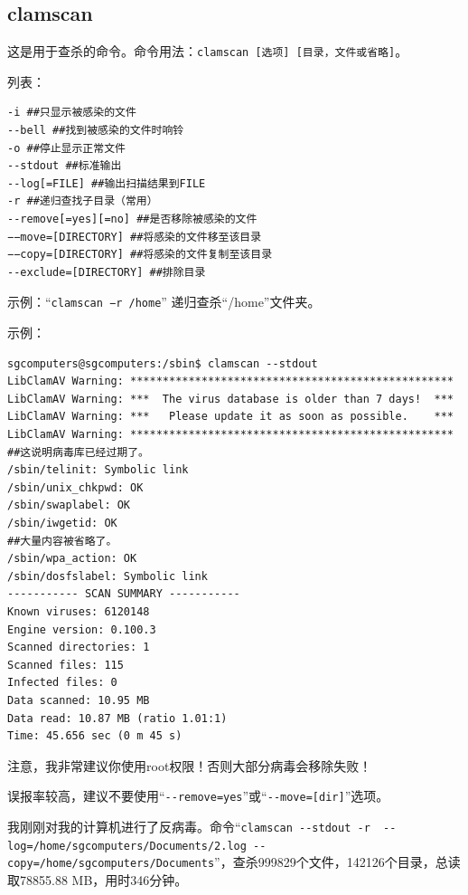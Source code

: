 \subsection{clamscan}
\cite{mancs}\par
这是用于查杀的命令。命令用法：\verb|clamscan [选项] [目录，文件或省略]|。\par
[选项]列表：\par
\begin{verbatim}
-i ##只显示被感染的文件
--bell ##找到被感染的文件时响铃
-o ##停止显示正常文件
--stdout ##标准输出
--log[=FILE] ##输出扫描结果到FILE
-r ##递归查找子目录（常用）
--remove[=yes][=no] ##是否移除被感染的文件
−−move=[DIRECTORY] ##将感染的文件移至该目录
−−copy=[DIRECTORY] ##将感染的文件复制至该目录
--exclude=[DIRECTORY] ##排除目录
\end{verbatim} \par
示例：“\verb|clamscan −r /home|”  递归查杀“/home”文件夹。\par
示例：
\begin{verbatim}
sgcomputers@sgcomputers:/sbin$ clamscan --stdout
LibClamAV Warning: **************************************************
LibClamAV Warning: ***  The virus database is older than 7 days!  ***
LibClamAV Warning: ***   Please update it as soon as possible.    ***
LibClamAV Warning: **************************************************
##这说明病毒库已经过期了。
/sbin/telinit: Symbolic link
/sbin/unix_chkpwd: OK
/sbin/swaplabel: OK
/sbin/iwgetid: OK
##大量内容被省略了。
/sbin/wpa_action: OK
/sbin/dosfslabel: Symbolic link
----------- SCAN SUMMARY -----------
Known viruses: 6120148
Engine version: 0.100.3
Scanned directories: 1
Scanned files: 115
Infected files: 0
Data scanned: 10.95 MB
Data read: 10.87 MB (ratio 1.01:1)
Time: 45.656 sec (0 m 45 s)
\end{verbatim} \par
{\color{red}注意，我非常建议你使用root权限！否则大部分病毒会移除失败！\par 误报率较高，建议不要使用“\verb|--remove=yes|”或“\verb|--move=[dir]|”选项。}\par
我刚刚对我的计算机进行了反病毒。命令“\verb|clamscan --stdout -r  --log=/home/sgcomputers/Documents/2.log --copy=/home/sgcomputers/Documents|”，查杀999829个文件，142126个目录，总读取78855.88 MB，用时346分钟。
